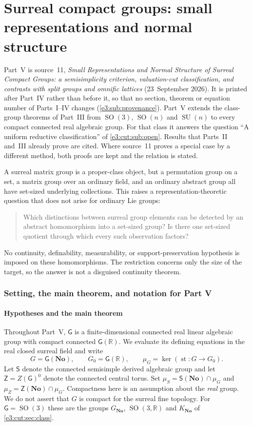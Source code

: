 \documentclass[11pt,letterpaper]{article}
\numberwithin{equation}{section}
\theoremstyle{definition}
\theoremstyle{remark}
\newcommand{\No}{\mathbf{No}}
\newcommand{\R}{\mathbb R}
\newcommand{\st}{\operatorname{st}}
\newcommand{\SO}{\operatorname{SO}}
\newcommand{\SU}{\operatorname{SU}}
\newcommand{\sG}{\mathsf G}
\newcommand{\sS}{\mathsf S}
\newcommand{\sZ}{\mathsf Z}
\begin{document}
\part{Surreal compact groups: small representations and normal structure}\label{e3:cpt:part}

Part~V is source~11, \emph{Small Representations and Normal Structure of
Surreal Compact Groups: a semisimplicity criterion, valuation-cut
classification, and contrasts with split groups and omnific lattices}
(23~September 2026). It is printed after Part~IV rather than before it, so that
no section, theorem or equation number of Parts~I--IV changes
(\cref{e3:sub:provenance}). Part~V extends the class-group theorems of Part~III
from $\SO(3)$, $\SO(n)$ and $\SU(n)$ to every compact connected real algebraic
group. For that class it answers the question ``A uniform reductive
classification'' of \cref{e3:cut:sub:open}. Results that Parts~II and~III
already prove are cited. Where source~11 proves a special case by a different
method, both proofs are kept and the relation is stated.

A surreal matrix group is a proper-class object, but a permutation group on a
set, a matrix group over an ordinary field, and an ordinary abstract group all
have set-sized underlying collections. This raises a representation-theoretic
question that does not arise for ordinary Lie groups:
\begin{quote}
Which distinctions between surreal group elements can be detected by an
abstract homomorphism into a set-sized group? Is there one set-sized quotient
through which every such observation factors?
\end{quote}
No continuity, definability, measurability, or support-preservation hypothesis
is imposed on these homomorphisms. The restriction concerns only the size of
the target, so the answer is not a disguised continuity theorem.

\section{Setting, the main theorem, and notation for Part V}\label{e3:cpt:sec:intro}

\subsection{Hypotheses and the main theorem}\label{e3:cpt:sub:main}

Throughout Part~V, $\sG$ is a finite-dimensional connected real linear
algebraic group with compact connected $\sG(\R)$. We evaluate its defining
equations in the real closed surreal field and write
\[
 G=\sG(\No),\qquad G_0=\sG(\R),\qquad
 \mu_G=\ker(\st:G\longrightarrow G_0).
\]
Let $\sS$ denote the connected semisimple derived algebraic group and let
$\sZ=Z(\sG)^0$ denote the connected central torus. Set
$\mu_S=\sS(\No)\cap\mu_G$ and $\mu_Z=\sZ(\No)\cap\mu_G$.
Compactness here is an assumption about the \emph{real} group. We do not assert
that $G$ is compact for the surreal fine topology. For $\sG=\SO(3)$ these are
the groups $G_{\No}$, $\SO(3,\R)$ and $K_{\No}$ of \cref{e3:cut:sec:class}.
\end{document}
